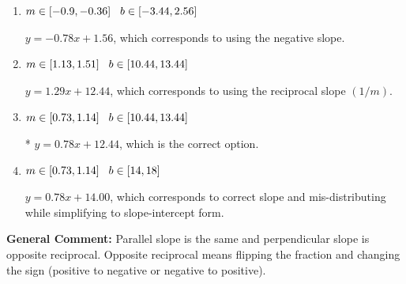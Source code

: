 \documentclass{extbook}[14pt]
\begin{document}
\begin{enumerate}
{\begin{enumerate}[label=\Alph*.]
 $y = 0.78x - 12.44$, which corresponds to using the correct slope and getting the negative $y$-intercept.
\item \( m \in [-0.9, -0.36] \hspace*{3mm} b \in [-3.44, 2.56] \)

 $y = -0.78x + 1.56$, which corresponds to using the negative slope.
\item \( m \in [1.13, 1.51] \hspace*{3mm} b \in [10.44, 13.44] \)

 $y = 1.29x + 12.44$, which corresponds to using the reciprocal slope $(1/m)$.
\item \( m \in [0.73, 1.14] \hspace*{3mm} b \in [10.44, 13.44] \)

* $y = 0.78x + 12.44$, which is the correct option.
\item \( m \in [0.73, 1.14] \hspace*{3mm} b \in [14, 18] \)

 $y = 0.78x + 14.00$, which corresponds to correct slope and mis-distributing while simplifying to slope-intercept form.
\end{enumerate}

\textbf{General Comment:} Parallel slope is the same and perpendicular slope is opposite reciprocal. Opposite reciprocal means flipping the fraction and changing the sign (positive to negative or negative to positive).
}
\end{enumerate}
\end{document}
